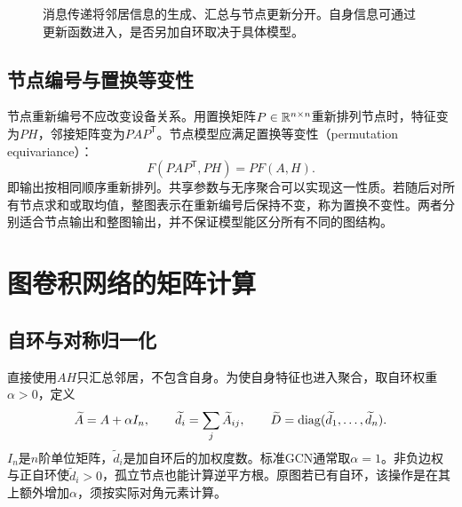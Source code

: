 \begin{figure}[htbp]
\centering
{}
\caption{消息传递将邻居信息的生成、汇总与节点更新分开。自身信息可通过更新函数进入，是否另加自环取决于具体模型。}
\label{fig:graph-message-passing}
\end{figure}

\subsection{节点编号与置换等变性}
节点重新编号不应改变设备关系。用置换矩阵$P\in\mathbb{R}^{n\times n}$重新排列节点时，特征变为$PH$，邻接矩阵变为$PAP^{\mathsf T}$。节点模型应满足置换等变性（permutation equivariance）：
\begin{equation}
 F(PAP^{\mathsf T},PH)=PF(A,H).
 \label{eq:graph-permutation-equivariance}
\end{equation}
即输出按相同顺序重新排列。共享参数与无序聚合可以实现这一性质。若随后对所有节点求和或取均值，整图表示在重新编号后保持不变，称为置换不变性。两者分别适合节点输出和整图输出，并不保证模型能区分所有不同的图结构。

\section{图卷积网络的矩阵计算}
\subsection{自环与对称归一化}
直接使用$AH$只汇总邻居，不包含自身。为使自身特征也进入聚合，取自环权重$\alpha>0$，定义
\begin{equation}
 \widetilde A=A+\alpha I_n,\qquad
 \widetilde d_i=\sum_j\widetilde A_{ij},\qquad
 \widetilde D=\operatorname{diag}(\widetilde d_1,\ldots,\widetilde d_n).
 \label{eq:graph-self-loop-degree}
\end{equation}
$I_n$是$n$阶单位矩阵，$\widetilde d_i$是加自环后的加权度数。标准GCN通常取$\alpha=1$。非负边权与正自环使$\widetilde d_i>0$，孤立节点也能计算逆平方根。原图若已有自环，该操作是在其上额外增加$\alpha$，须按实际对角元素计算。

